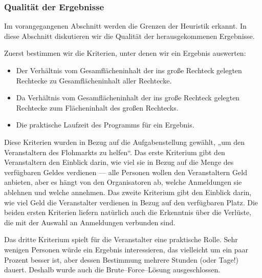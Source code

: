 \subsubsection{Qualität der Ergebnisse}\label{sec:diskussion-ergebnisse}
Im vorangegangenen Abschnitt werden die Grenzen der Heuristik erkannt. 
In diese Abschnitt diskutieren wir die Qualität der herausgekommenen Ergebnisse.

Zuerst bestimmen wir die Kriterien, unter denen wir ein Ergebnis auswerten:
\begin{itemize}
	\item Der Verhältnis vom Gesamflächeninhalt der ins große Rechteck gelegten Rechtecke 
	zu Gesamflächeninhalt aller Rechtecke.
	\item Da Verhältnis vom Gesamflächeninhalt der ins große Rechteck gelegten Rechtecke 
	zum Flächeninhalt des großen Rechtecks.
	\item Die praktische Laufzeit des Programms für ein Ergebnis.
\end{itemize}

Diese Kriterien wurden in Bezug auf die Aufgabenstellung gewählt,
„um den Veranstaltern des Flohmarkts zu helfen“.
Das erste Kriterium gibt den Veranstaltern den Einblick darin,
wie viel sie in Bezug auf die Menge des verfügbaren Geldes verdienen ---
alle Personen wollen den Veranstaltern Geld anbieten, aber es hängt von den 
Organisatoren ab, welche Anmeldungen sie ablehnen und welche annehmen.
Das zweite Kriterium gibt den Einblick darin, wie viel Geld die 
Veranstalter verdienen in Bezug auf den verfügbaren Platz. 
Die beiden ersten Kriterien liefern natürlich auch die Erkenntnis über die Verlüste, die 
mit der Auswahl an Anmeldungen verbunden sind.

Das dritte Kriterium spielt für die Veranstalter eine praktische Rolle.
Sehr wenigen Personen würde ein Ergebnis interessieren, das vielleicht um ein paar Prozent 
besser ist, aber dessen Bestimmung mehrere Stunden (oder Tage!) dauert. 
Deshalb wurde auch die Brute--Force--Lösung ausgeschlossen.

